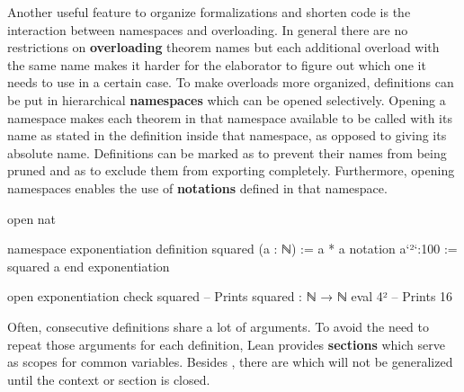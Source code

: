 Another useful feature to organize formalizations and shorten code is the interaction
between namespaces and overloading.
In general there are no restrictions on \textbf{overloading} theorem names but each additional
overload with the same name makes it harder for the elaborator to figure out which
one it needs to use in a certain case.
To make overloads more organized, definitions can be put in hierarchical \textbf{namespaces}
which can be opened selectively.
Opening a namespace makes each theorem in that namespace available to be called
with its name as stated in the definition inside that namespace, as opposed to
giving its absolute name.
Definitions can be marked as  to prevent their names from being
pruned and as  to exclude them from exporting completely.
Furthermore, opening namespaces enables the use of \textbf{notations} defined
in that namespace.
\begin{leancode}
open nat

namespace exponentiation
  definition squared (a : ℕ) := a * a
  notation a`²`:100 := squared a
end exponentiation

open exponentiation
check squared -- Prints squared : ℕ → ℕ
eval 4² -- Prints 16
\end{leancode}
Often, consecutive definitions share a lot of arguments.
To avoid the need to repeat those arguments for each definition, Lean provides
\textbf{sections} which serve as scopes for common variables.
Besides , there are  which will not be generalized
until the context or section is closed.

